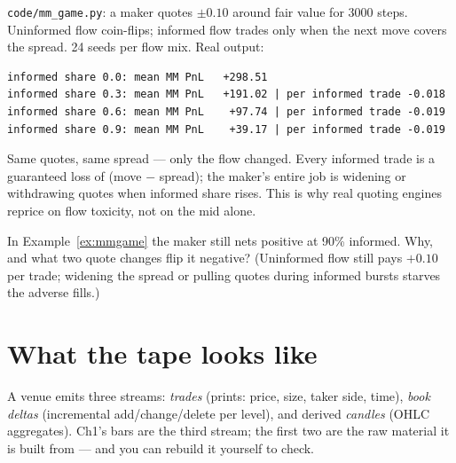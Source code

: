 \begin{example}\label{ex:mmgame}
\texttt{code/mm\_game.py}: a maker quotes $\pm0.10$ around fair
value for 3000 steps. Uninformed flow coin-flips; informed flow
trades only when the next move covers the spread. 24 seeds per
flow mix. Real output:
\begin{lstlisting}[numbers=none]
informed share 0.0: mean MM PnL   +298.51
informed share 0.3: mean MM PnL   +191.02 | per informed trade -0.018
informed share 0.6: mean MM PnL    +97.74 | per informed trade -0.019
informed share 0.9: mean MM PnL    +39.17 | per informed trade -0.019
\end{lstlisting}
Same quotes, same spread --- only the flow changed. Every informed
trade is a guaranteed loss of (move $-$ spread); the maker's entire
job is widening or withdrawing quotes when informed share rises.
This is why real quoting engines reprice on flow toxicity, not on
the mid alone.
\end{example}

\begin{checkpoint}
In Example~\ref{ex:mmgame} the maker still nets positive at 90\%
informed. Why, and what two quote changes flip it negative?
(Uninformed flow still pays $+0.10$ per trade; widening the spread
or pulling quotes during informed bursts starves the adverse
fills.)
\end{checkpoint}

\section{What the tape looks like}\label{sec:tape}
A venue emits three streams: \emph{trades} (prints: price, size,
taker side, time), \emph{book deltas} (incremental
add/change/delete per level), and derived \emph{candles} (OHLC
aggregates). Ch1's bars are the third stream; the first two are the
raw material it is built from --- and you can rebuild it yourself to
check.


